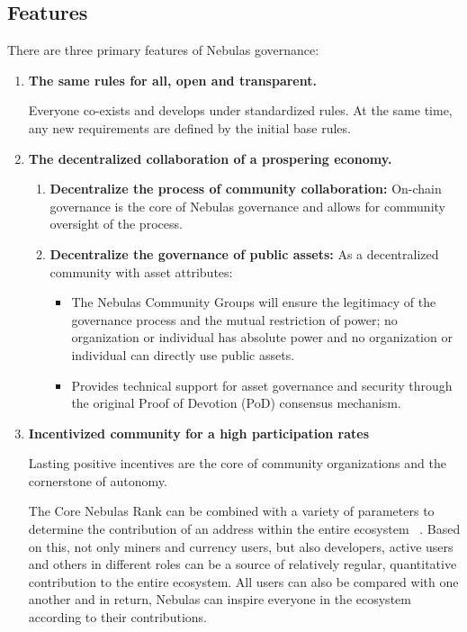 \subsection{Features}

There are three primary features of Nebulas governance:

\begin{enumerate}
	\item 

	\textbf{The same rules for all, open and transparent.} 

	Everyone co-exists and develops under standardized rules. At the same time, any new requirements are defined by the initial base rules.

	\item 

\textbf{The decentralized collaboration of a prospering economy.}


	\begin{enumerate}
		\item 

		\textbf{Decentralize the process of community collaboration:} On-chain governance is the core of Nebulas governance and allows for community oversight of the process.
		
		\item 

		\textbf{Decentralize the governance of public assets:} As a decentralized community with asset attributes:

		\begin{itemize}
			\item The Nebulas Community Groups will ensure the legitimacy of the governance process and the mutual restriction of power; no organization or individual has absolute power and no organization or individual can directly use public assets.
			\item Provides technical support for asset governance and security through the original Proof of Devotion (PoD) consensus mechanism.
		\end{itemize}

	\end{enumerate}

	\item 

	\textbf{Incentivized community for a high participation rates}
	
	Lasting positive incentives are the core of community organizations and the cornerstone of autonomy.

	The Core Nebulas Rank can be combined with a variety of parameters to determine the contribution of an address within the entire ecosystem ~\cite{yellowpaper}. Based on this, not only miners and currency users, but also developers, active users and others in different roles can be a source of relatively regular, quantitative contribution to the entire ecosystem. All users can also be compared with one another and in return, Nebulas can inspire everyone in the ecosystem according to their contributions.


\end{enumerate}
